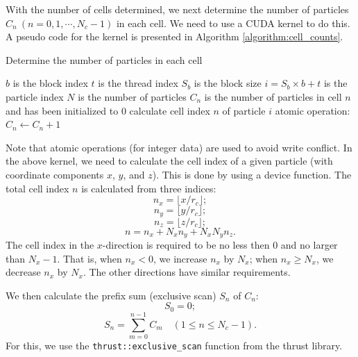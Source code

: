 \documentclass[12pt,a4paper]{report}
\begin{document}
With the number of cells determined, we next determine the number of particles $C_n ~(n=0, 1, \cdots, N_c-1)$ in each cell. We need to use a CUDA kernel to do this. A pseudo code for the kernel is presented in Algorithm  \ref{algorithm:cell_counts}.


\begin{algorithm}[htbp]
\caption{Determine the number of particles in each cell}
\label{algorithm:cell_counts}
\begin{algorithmic}[1]
\Require $b$ is the block index
\Require $t$ is the thread index
\Require $S_b$ is the block size
\Require $i=S_b\times b+t$ is the particle index
\Require $N$ is the number of particles
\Require $C_n$ is the number of particles in cell $n$ and has been initialized to 0
	\State calculate cell index $n$ of particle $i$
	\State atomic operation: $C_n \leftarrow C_n +1$
\EndIf
 \end{algorithmic}
\end{algorithm}

Note that atomic operations (for integer data) are used to avoid write conflict. In the above kernel, we need to calculate the cell index of a given particle (with coordinate components $x$, $y$, and $z$). This is done by using a device function. The total cell index $n$ is calculated from three indices:
\begin{equation}
n_x = \lfloor x / r_c \rfloor;
\end{equation}
\begin{equation}
n_y = \lfloor y / r_c \rfloor;
\end{equation}
\begin{equation}
n_z = \lfloor z / r_c \rfloor;
\end{equation}
\begin{equation}
n = n_x + N_x n_y + N_x N_y n_z.
\end{equation}
The cell index in the $x$-direction is required to be no less then 0 and no larger than $N_x-1$. That is, when $n_x < 0$, we increase $n_x$ by $N_x$; when $n_x \geq N_x$, we decrease $n_x$ by $N_x$. The other directions have similar requirements.

We then calculate the prefix sum (exclusive scan) $S_n$ of $C_n$:
\begin{equation}
S_0 = 0;
\end{equation}
\begin{equation}
S_n = \sum_{m=0}^{n-1} C_m \quad (1 \leq n \leq N_c-1).
\end{equation}
For this, we use the \verb"thrust::exclusive_scan" function from the thrust library.
\end{document}
